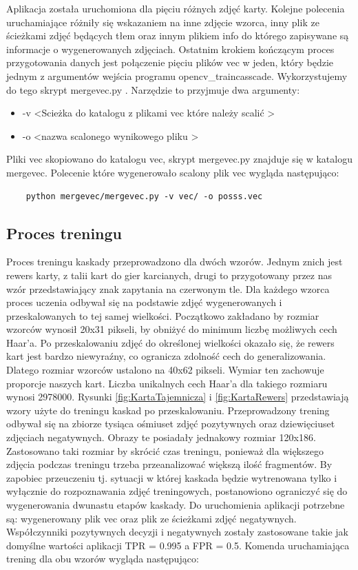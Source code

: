 Aplikacja została uruchomiona dla pięciu różnych zdjęć karty. Kolejne polecenia uruchamiające różniły się wskazaniem na inne zdjęcie wzorca, inny plik ze ścieżkami zdjęć będących tłem oraz innym plikiem info do którego zapisywane są informacje o wygenerowanych zdjęciach.
Ostatnim krokiem kończącym proces przygotowania danych jest połączenie pięciu plików vec w jeden, który będzie jednym z argumentów wejścia programu opencv\_traincasscade. Wykorzystujemy do tego skrypt mergevec.py \cite{mergeVec}. Narzędzie to przyjmuje dwa argumenty:
\begin{itemize}
    \item -v \textless Scieżka do katalogu z plikami vec które należy scalić \textgreater
    \item -o \textless nazwa scalonego wynikowego pliku \textgreater
\end{itemize}
Pliki vec skopiowano do katalogu vec, skrypt mergevec.py znajduje się w katalogu mergevec. Polecenie które wygenerowało scalony plik vec wygląda następująco: 
\begin{lstlisting}
    python mergevec/mergevec.py -v vec/ -o posss.vec
\end{lstlisting}
\subsection{Proces treningu}

Proces treningu kaskady przeprowadzono dla dwóch wzorów. Jednym znich jest rewers karty, z talii kart do gier karcianych, drugi to przygotowany przez nas wzór przedstawiający znak zapytania na czerwonym tle. Dla każdego wzorca proces uczenia odbywał się na podstawie zdjęć wygenerowanych i przeskalowanych to tej samej wielkości. Początkowo zakładano by rozmiar wzorców wynosił 20x31 pikseli, by obniżyć do minimum liczbę możliwych cech Haar'a.
Po przeskalowaniu zdjęć do określonej wielkości okazało się, że rewers kart jest bardzo niewyraźny, co ogranicza zdolność cech do generalizowania. Dlatego rozmiar wzorców ustalono na 40x62 pikseli. Wymiar ten zachowuje proporcje naszych kart. Liczba unikalnych cech Haar'a dla takiego rozmiaru wynosi 2978000. Rysunki \ref{fig:KartaTajemnicza} i \ref{fig:KartaRewers} przedstawiają wzory użyte do treningu kaskad po przeskalowaniu. Przeprowadzony trening odbywał się na zbiorze tysiąca ośmiuset zdjęć pozytywnych oraz dziewięciuset zdjęciach negatywnych. Obrazy te posiadały jednakowy rozmiar 120x186. Zastosowano taki rozmiar by skrócić czas treningu, ponieważ dla większego zdjęcia podczas treningu trzeba przeanalizować większą ilość fragmentów. By zapobiec przeuczeniu tj. sytuacji w której kaskada będzie wytrenowana tylko i wyłącznie do rozpoznawania zdjęć treningowych, postanowiono ograniczyć się do wygenerowania dwunastu etapów kaskady. Do uruchomienia aplikacji potrzebne są: wygenerowany plik vec oraz plik ze ścieżkami zdjęć negatywnych. Współczynniki pozytywnych decyzji i negatywnych zostały zastosowane takie jak domyślne wartości aplikacji TPR = 0.995 a FPR = 0.5. Komenda uruchamiająca trening dla obu wzorów wygląda następująco:

